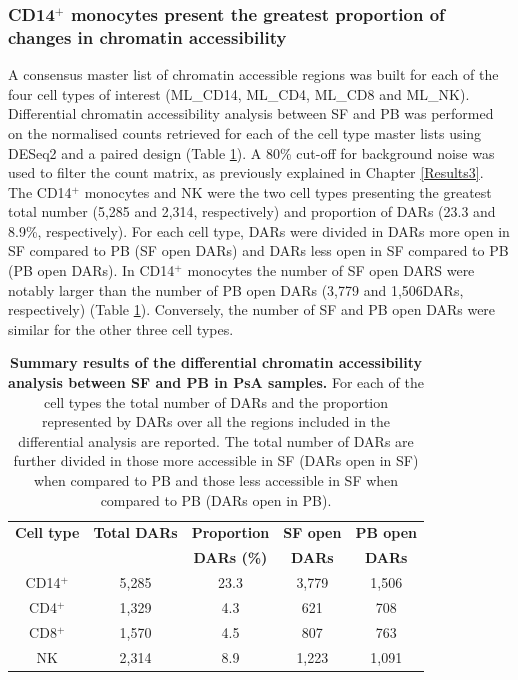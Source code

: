 \subsubsection{CD14$^+$ monocytes present the greatest proportion of changes in chromatin accessibility}
A consensus master list of chromatin accessible regions was built for each of the four cell types of interest (ML\_CD14, ML\_CD4, ML\_CD8 and ML\_NK). Differential chromatin accessibility analysis between SF and PB was performed on the normalised counts retrieved for each of the cell type master lists using DESeq2 and a paired design (Table \ref{tab:PSA_DOCs_results}). A 80\% cut-off for background noise was used to filter the count matrix, as previously explained in Chapter \ref{Results3}. %
The CD14$^+$ monocytes and NK were the two cell types presenting the greatest total number (5,285 and 2,314, respectively) and proportion of DARs (23.3 and 8.9\%, respectively). For each cell type, DARs were divided in DARs more open in SF compared to PB (SF open DARs) and DARs less open in SF compared to PB (PB open DARs). In CD14$^+$ monocytes the number of SF open DARS were notably larger than the number of PB open DARs (3,779 and 1,506DARs, respectively) (Table \ref{tab:PSA_DOCs_results}). Conversely, the number of SF and PB open DARs were similar for the other three cell types.


\begin{table}[htbp]
\centering
\begin{tabular}{@{}c c c c c}
\toprule
\textbf{Cell type}  & \textbf{Total DARs} &  \textbf{Proportion}  & \textbf{SF open} & \textbf{PB open} \\
                    &                     &  \textbf{DARs (\%)}  & \textbf{DARs} & \textbf{DARs} \\
\midrule
\midrule
CD14$^+$ & 5,285 & 23.3 & 3,779 & 1,506 \\
CD4$^+$  & 1,329 & 4.3 & 621 & 708 \\
CD8$^+$  & 1,570 & 4.5 & 807 & 763 \\
NK       & 2,314 & 8.9 & 1,223 & 1,091 \\
\bottomrule
\end{tabular}
\medskip %
\caption[Summary results of the differential chromatin accessibility analysis between SF and PB in PsA samples.]{\textbf{Summary results of the differential chromatin accessibility analysis between SF and PB in PsA samples.} For each of the cell types the total number of DARs and the proportion represented by DARs over all the regions included in the differential analysis are reported. The total number of DARs are further divided in those more accessible in SF (DARs open in SF) when compared to PB and those less accessible in SF when compared to PB (DARs open in PB).}
\label{tab:PSA_DOCs_results}
\end{table}

